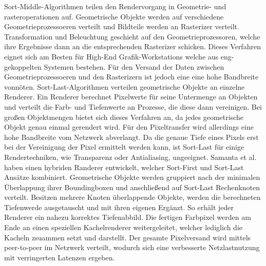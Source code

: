 Sort-Middle-Algorithmen teilen den Rendervorgang in Geometrie- und rasteroperationen auf. Geometrische Objekte werden auf verschiedene Geometrieprozessoeren verteilt und Bildteile werden an Rasterizer verteilt. Transformation und Beleuchtung geschieht auf den Geometrieprozessoren, welche ihre Ergebnisse dann an die entsprechenden Rasterizer schicken. Dieses Verfahren eignet sich am Besten für High-End Grafik-Workstations welche aus eng-gekoppelten Systemen bestehen. Für den Versand der Daten zwischen Geometrieprozessoeren und den Rasterizern ist jedoch eine eine hohe Bandbreite vonnöten.\linebreak\linebreak
Sort-Last-Algorithmen verteilen geometrische Objekte an einzelne Renderer. Ein Renderer berechnet Pixelwerte für seine Untermenge an Objekten und verteilt die Farb- und Tiefenwerte an Prozesse, die diese dann vereinigen. Bei großen Objektmengen bietet sich dieses Verfahren an, da jedes geometrische Objekt genau einmal gerendert wird. Für den Pixeltransfer wird allerdings eine hohe Bandbreite vom Netzwerk abverlangt. Da die genaue Tiefe eines Pixels erst bei der Vereinigung der Pixel ermittelt werden kann, ist Sort-Last für einige Rendertechniken, wie Transparenz oder Antialiasing, ungeeignet.\linebreak\linebreak
Samanta et al.\cite{samanta} haben einen hybriden Randerer entwickelt, welcher Sort-First und Sort-Last Ansätze kombiniert. Geometrische Objekte werden gruppiert nach der minimalen Überlappung ihrer Boundingboxen und anschließend auf Sort-Last Rechenknoten verteilt. Besitzen mehrere Knoten überlappende Objekte, werden die berechneten Tiefenwerde ausgetauscht und mit ihren eigenen Ergänzt. So erhält jeder Renderer ein nahezu korrektes Tiefenabbild. Die fertigen Farbpixel werden am Ende an einen speziellen Kachelrenderer weitergeleitet, welcher lediglich die Kacheln zsuammen setzt und darstellt. Der gesamte Pixelversand wird mittels peer-to-peer im Netzwerk verteilt, wodurch sich eine verbesserte Netzlastnutzung mit verringerten Latenzen ergeben.\linebreak

